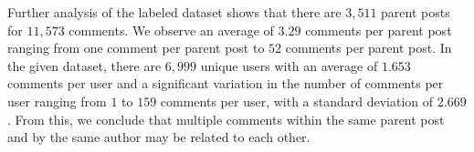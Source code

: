 \documentclass[runningheads]{llncs}
\begin{document}
Further analysis of the labeled dataset shows that there are $3,511$ parent posts for $11,573$ comments. We observe an average of $3.29$ comments per parent post ranging from one comment per parent post to $52$ comments per parent post. In the given dataset, there are $6,999$ unique users with an average of $1.653$ comments per user and a significant variation in the number of comments per user ranging from $1$ to $159$ comments per user, with a standard deviation of $2.669$. From this, we conclude that multiple comments within the same parent post and by the same author may be related to each other.
\begin{table}[]
\centering
{}
\end{table}
\end{document}
